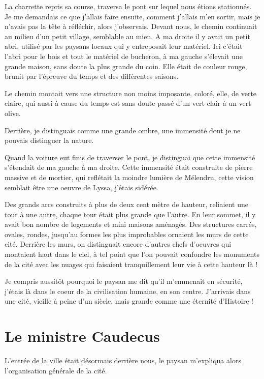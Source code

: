 \documentclass{book}
\begin{document}
La charrette repris sa course, traversa le pont sur lequel nous étions stationnés. Je me demandais ce que j'allais faire ensuite, comment j'allais m'en sortir, mais je n'avais pas la tête à réfléchir, alors j'observais. Devant nous, le chemin continuait au milieu d'un petit village, semblable au mien. A ma droite il y avait un petit abri, utilisé par les paysans locaux qui y entreposait leur matériel. Ici c'était l'abri pour le bois et tout le matériel de bucheron, à ma gauche s'élevait une grande maison, sans doute la plus grande du coin. Elle était de couleur rouge, brunit par l'épreuve du temps et des différentes saisons.\newline

Le chemin montait vers une structure non moins imposante, coloré, elle, de verte claire, qui aussi à cause du temps est sans doute passé d'un vert clair à un vert olive.\newline

Derrière, je distinguais comme une grande ombre, une immensité dont je ne pouvais distinguer la nature.\newline

Quand la voiture eut finis de traverser le pont, je distinguai que cette immensité s'étendait de ma gauche à ma droite. Cette immensité était construite de pierre massive et de mortier, qui reflétait la moindre lumière de Mélendru, cette vision semblait être une oeuvre de Lyssa, j'étais sidérée.\newline

Des grands arcs construits à plus de deux cent mètre de hauteur, reliaient une tour à une autre, chaque tour était plus grande que l'autre. En leur sommet, il y avait bon nombre de logements et mini maisons aménagés. Des structures carrés, ovales, rondes, jusqu'au formes les plus improbables ornaient les murs de cette cité. Derrière les murs, on distinguait encore d'autres chefs d'oeuvres qui montaient haut dans le ciel, à tel point que l'on pouvait confondre les monuments de la cité avec les nuages qui faisaient tranquillement leur vie à cette hauteur là !\newline

Je compris aussitôt pourquoi le paysan me dit qu'il m'emmenait en sécurité, j'étais là dans le coeur de la civilisation humaine, en son centre. J'arrivais dans une cité, vieille à peine d'un siècle, mais grande comme une éternité d'Histoire !\newline

\chapter{Le ministre Caudecus}
L'entrée de la ville était désormais derrière nous, le paysan m'expliqua alors l'organisation générale de la cité.\newline
\end{document}
